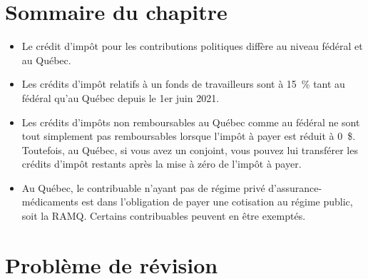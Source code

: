 \section{Sommaire du chapitre}
\begin{itemize}
	\item Le crédit d'impôt pour les contributions politiques diffère au niveau fédéral et au Québec.
	\item Les crédits d'impôt relatifs à un fonds de travailleurs sont à 15~\% tant au fédéral qu'au Québec depuis le 1er juin 2021.
	\item Les crédits d'impôts non remboursables au Québec comme au fédéral ne sont tout simplement pas remboursables lorsque l'impôt à payer est réduit à 0~\$. Toutefois, au Québec, si vous avez un conjoint, vous pouvez lui transférer les crédits d'impôt restants après la mise à zéro de l'impôt à payer.
	\item Au Québec, le contribuable n'ayant pas de régime privé d'assurance-médicaments est dans l'obligation de payer une cotisation au régime public, soit la RAMQ. Certains contribuables peuvent en être exemptés.
\end{itemize}



\section{Problème de révision}
